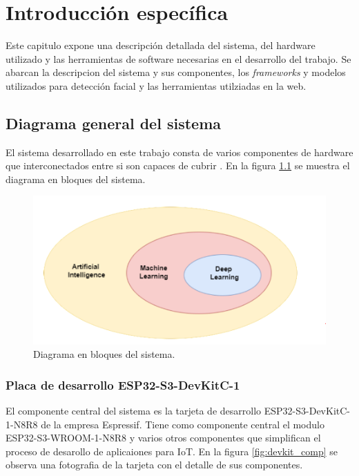 \chapter{Introducción específica} %

\label{Chapter2}

Este capitulo expone una descripción detallada del sistema, del hardware utilizado y las herramientas de  software necesarias en el desarrollo del trabajo. Se abarcan la descripcion del sistema y sus componentes, los \textit{frameworks} y modelos utilizados para detección facial y las herramientas utilziadas en la web.

\section{Diagrama general del sistema}
El sistema desarrollado en este trabajo consta de varios componentes de hardware que interconectados entre si son capaces de cubrir . En la figura \ref{fig:sys_blocks} se muestra el diagrama en bloques del sistema.

\begin{figure}[h]
	\centering
	\includegraphics[scale=0.3]{./Figures/ai_ml_dl.png}
	\caption{Diagrama en bloques del sistema.}
	\label{fig:sys_blocks}
\end{figure}

\subsection{Placa de desarrollo ESP32-S3-DevKitC-1}
El componente central del sistema es la tarjeta de desarrollo ESP32-S3-DevKitC-1-N8R8 de la empresa Espressif. Tiene como componente central el modulo ESP32-S3-WROOM-1-N8R8 y varios otros componentes que simplifican el proceso de desarollo de aplicaiones para IoT. En la figura \ref{fig:devkit_comp} se observa una fotografia de la tarjeta con el detalle de sus componentes.

